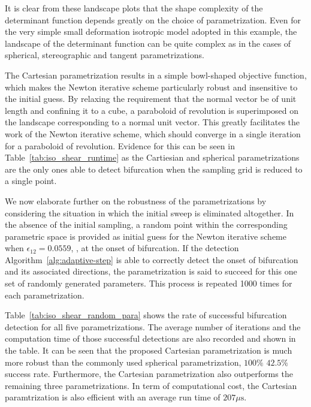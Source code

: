 \documentclass[12pt]{article}
\numberwithin{equation}{section}
\begin{document}
It is clear from these landscape plots that the shape
complexity of the determinant function depends greatly on the choice
of parametrization. Even for the very simple small deformation isotropic
model adopted in this example, the landscape of the determinant
function can be quite complex as in the cases of spherical,
stereographic and tangent parametrizations.

The Cartesian parametrization results in a simple bowl-shaped
objective function, which makes the Newton iterative scheme
particularly robust and insensitive to the initial guess.  By relaxing
the requirement that the normal vector be of unit length and confining
it to a cube, a paraboloid of revolution is superimposed on the
landscape corresponding to a normal unit vector. This greatly
facilitates the work of the Newton iterative scheme, which should
converge in a single iteration for a paraboloid of revolution.
Evidence for this can be seen in Table~\ref{tab:iso_shear_runtime} as
the Cartiesian and spherical parametrizations are the only ones able
to detect bifurcation when the sampling grid is reduced to a single
point.

We now elaborate further on the robustness of the parametrizations by
considering the situation in which the initial sweep is eliminated
altogether. In the absence of the initial sampling, a random point
within the corresponding parametric space is provided as initial guess
for the Newton iterative scheme when $\epsilon_{12}=0.0559$, \ie, at
the onset of bifurcation. If the detection
Algorithm~\ref{alg:adaptive-step} is able to correctly detect the
onset of bifurcation and its associated directions, the
parametrization is said to succeed for this one set of randomly
generated parameters. This process is repeated 1000 times for each
parametrization.

Table~\ref{tab:iso_shear_random_para} shows the rate of successful
bifurcation detection for all five parametrizations. The average
number of iterations and the computation time of those successful
detections are also recorded and shown in the table. It can be seen
that the proposed Cartesian parametrization is much more robust than
the commonly used spherical parametrization, \cf $100\%$ \vs $42.5\%$
success rate. Furthermore, the Cartesian parametrization also
outperforms the remaining three parametrizations. In term of
computational cost, the Cartesian paramtrization is also efficient
with an average run time of $207\mu\text{s}$.
\end{document}
